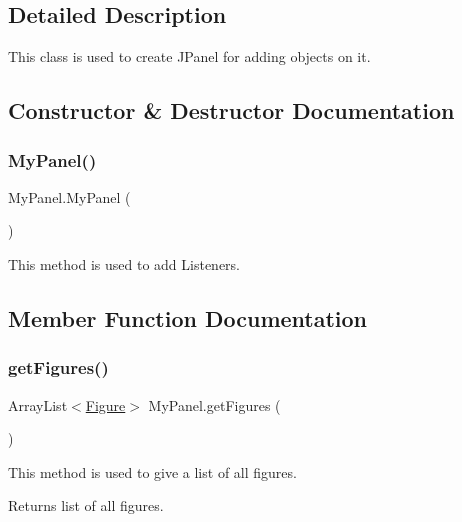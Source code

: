 \subsection{Detailed Description}
This class is used to create J\+Panel for adding objects on it. 

\subsection{Constructor \& Destructor Documentation}
\mbox{\label{class_my_panel_a9395d78dbd3ccb9159bcdfd8fa54bf62}} 
\subsubsection{\texorpdfstring{MyPanel()}{MyPanel()}}
{\footnotesize\ttfamily My\+Panel.\+My\+Panel (\begin{DoxyParamCaption}{ }\end{DoxyParamCaption})}

This method is used to add Listeners. 

\subsection{Member Function Documentation}
\mbox{\label{class_my_panel_a5973b6511dee7060ee7cc5e49b37c836}} 
\subsubsection{\texorpdfstring{getFigures()}{getFigures()}}
{\footnotesize\ttfamily Array\+List$<$\mbox{\hyperlink{class_figure}{Figure}}$>$ My\+Panel.\+get\+Figures (\begin{DoxyParamCaption}{ }\end{DoxyParamCaption})}

This method is used to give a list of all figures. \begin{DoxyReturn}{Returns}
list of all figures. 
\end{DoxyReturn}
\mbox{\label{class_my_panel_a657ce352f2f06f2cf535b08019849bef}} 
